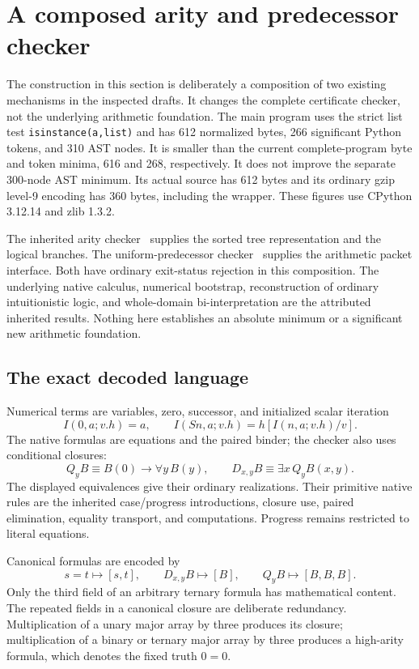 \section{A composed arity and predecessor checker}
\label{sec:composed-checker}
\label{sec:composition}

The construction in this section is deliberately a composition of two
existing mechanisms in the inspected drafts.  It changes the complete
certificate checker, not the underlying arithmetic foundation.  The main
program uses the strict list test \texttt{isinstance(a,list)} and has
612 normalized bytes, 266 significant Python tokens, and 310 AST nodes.
It is smaller than the current complete-program byte and token minima,
616 and 268, respectively.  It does not improve the separate 300-node
AST minimum.  Its actual source has 612 bytes and its ordinary gzip
level-9 encoding has 360 bytes, including the wrapper.  These figures
use CPython 3.12.14 and zlib 1.3.2.

The inherited arity checker~\cite{arity} supplies the sorted tree representation and
the logical branches.  The uniform-predecessor checker~\cite{uniform} supplies the
arithmetic packet interface.  Both have ordinary exit-status rejection
in this composition.  The underlying native calculus, numerical
bootstrap, reconstruction of ordinary intuitionistic logic, and
whole-domain bi-interpretation are the attributed inherited results.
Nothing here establishes an absolute minimum or a significant new
arithmetic foundation.

\subsection{The exact decoded language}

Numerical terms are variables, zero, successor, and initialized scalar
iteration
\[
 I(0,a;v.h)=a,\qquad
 I(Sn,a;v.h)=h[I(n,a;v.h)/v].
\]
The native formulas are equations and the paired binder; the checker
also uses conditional closures:
\[
 Q_y B\equiv B(0)\to\forall y\,B(y),\qquad
 D_{x,y}B\equiv\exists x\,Q_yB(x,y).
\]
The displayed equivalences give their ordinary realizations.  Their
primitive native rules are the inherited case/progress introductions,
closure use, paired elimination, equality transport, and computations.
Progress remains restricted to literal equations.

Canonical formulas are encoded by
\[
 s=t\longmapsto[s,t],\qquad
 D_{x,y}B\longmapsto[B],\qquad
 Q_yB\longmapsto[B,B,B].
\]
Only the third field of an arbitrary ternary formula has mathematical
content.  The repeated fields in a canonical closure are deliberate
redundancy.  Multiplication of a unary major array by three produces its
closure; multiplication of a binary or ternary major array by three
produces a high-arity formula, which denotes the fixed truth $0=0$.

